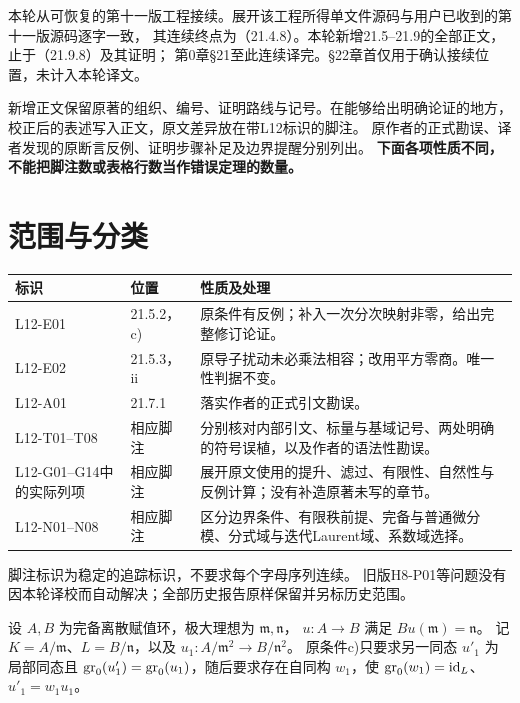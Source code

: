 本轮从可恢复的第十一版工程接续。展开该工程所得单文件源码与用户已收到的第十一版源码逐字一致，
其连续终点为（21.4.8）。本轮新增21.5--21.9的全部正文，止于（21.9.8）及其证明；
第0章§21至此连续译完。§22章首仅用于确认接续位置，未计入本轮译文。

新增正文保留原著的组织、编号、证明路线与记号。在能够给出明确论证的地方，
校正后的表述写入正文，原文差异放在带L12标识的脚注。
原作者的正式勘误、译者发现的原断言反例、证明步骤补足及边界提醒分别列出。
\textbf{下面各项性质不同，不能把脚注数或表格行数当作错误定理的数量。}

\section*{范围与分类}
\begin{longtable}{@{}p{.17\linewidth}p{.20\linewidth}p{.54\linewidth}@{}}
\toprule 标识&位置&性质及处理\\\midrule\endhead
L12-E01&21.5.2，c)&原条件有反例；补入一次分次映射非零，给出完整修订论证。\\
L12-E02&21.5.3，ii&原导子扰动未必乘法相容；改用平方零商。唯一性判据不变。\\
L12-A01&21.7.1&落实作者的正式引文勘误。\\
L12-T01--T08&相应脚注&分别核对内部引文、标量与基域记号、两处明确的符号误植，以及作者的语法性勘误。\\
L12-G01--G14中的实际列项&相应脚注&展开原文使用的提升、滤过、有限性、自然性与反例计算；没有补造原著未写的章节。\\
L12-N01--N08&相应脚注&区分边界条件、有限秩前提、完备与普通微分模、分式域与迭代Laurent域、系数域选择。\\
\bottomrule
\end{longtable}
脚注标识为稳定的追踪标识，不要求每个字母序列连续。
旧版H8-P01等问题没有因本轮译校而自动解决；全部历史报告原样保留并另标历史范围。

设 $A,B$ 为完备离散赋值环，极大理想为 $\mathfrak m,\mathfrak n$，
$u:A\to B$ 满足 $Bu(\mathfrak m)=\mathfrak n$。
记 $K=A/\mathfrak m$、$L=B/\mathfrak n$，以及
$u_1:A/\mathfrak m^2\to B/\mathfrak n^2$。
原条件c)只要求另一同态 $u'_1$ 为局部同态且
$\operatorname{gr}_0(u'_1)=\operatorname{gr}_0(u_1)$，随后要求存在自同构 $w_1$，使
$\operatorname{gr}_0(w_1)=\mathrm{id}_L$、$u'_1=w_1u_1$。

